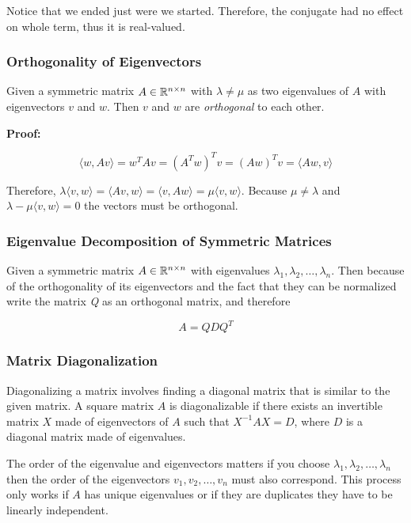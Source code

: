 Notice that we ended just were we started. Therefore, the conjugate had no effect on whole term, thus 
it is real-valued.

\QED

\subsubsection{Orthogonality of Eigenvectors}

Given a symmetric matrix \(A \in \mathbb{R}^{n \times n}\) with \(\lambda \ne \mu \) as two eigenvalues of 
\(A\) with eigenvectors \(v\) and \(w\). Then \(v\) and \(w\) are \emph{orthogonal} to each other.

\textbf{Proof:}

\[
    \langle w, Av \rangle = w^{T} Av = (A^T w)^T v = (Aw)^T v = \langle Aw, v\rangle
\]

Therefore, \(\lambda \langle v, w \rangle = \langle Av, w \rangle = \langle v, Aw\rangle 
= \mu \langle v, w \rangle\). Because \(\mu \ne \lambda\) and \(\lambda - \mu \langle v, w\rangle = 0\)
the vectors must be orthogonal.

\QED

\subsubsection{Eigenvalue Decomposition of Symmetric Matrices}

Given a symmetric matrix \(A \in \mathbb{R}^{n \times n}\) with eigenvalues 
\(\lambda_1, \lambda_2, \dots, \lambda_n\). Then because of the orthogonality of its eigenvectors and 
the fact that they can be normalized write the matrix \emph{Q} as an orthogonal matrix, and therefore

\[
    A = Q D Q^T
\]

\subsubsection{Matrix Diagonalization}

Diagonalizing a matrix involves finding a diagonal matrix that is similar to the given matrix. 
A square matrix \(A\) is diagonalizable if there exists an invertible matrix \(X\) made of eigenvectors of 
\(A\) such that \(X^{-1}AX = D\), where \(D\) is a diagonal matrix made of eigenvalues.

The order of the eigenvalue and eigenvectors matters if you choose 
\(\lambda_1, \lambda_2, \dots, \lambda_n\) then the order of the eigenvectors 
\(v_1, v_2, \dots, v_n\) must also correspond. This process only works if \(A\) 
has unique eigenvalues or if they are duplicates they have to be linearly independent.

